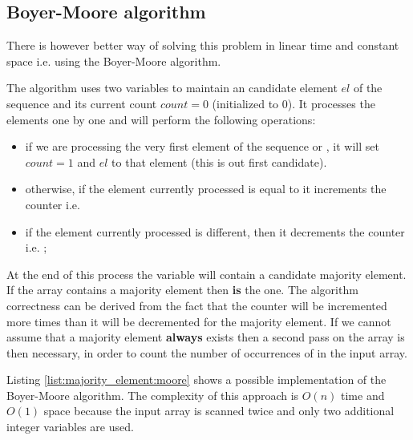 

\subsection{Boyer-Moore algorithm}
\label{majority_element:sec:linear}
There is however better way of solving this problem in linear time and constant space i.e. using the Boyer-Moore algorithm\cite{Boyer1991}.

The algorithm uses two variables to maintain an candidate element $el$ of the sequence and its current count $count=0$ (initialized to $0$). It processes the elements one by one and will perform the following operations:
\begin{itemize}
	\item if we are processing the very first element  of the sequence or , it will set $count=1$ and $el$ to that element (this is out first candidate).
	\item otherwise, if the element currently processed is equal to it increments the counter i.e. 
	\item if the element currently processed is different, then it decrements the counter i.e. ;
\end{itemize}


At the end of this process the variable  will contain a candidate majority element. If the array contains a majority element then  \textbf{is} the one. The algorithm correctness can be derived from the fact that the counter will be incremented more times than it will be decremented for the majority element. If we cannot assume that a majority element \textbf{always} exists then a second pass  on the array is then necessary, in order to count the number of occurrences of  in the input array.

Listing \ref{list:majority_element:moore} shows a possible implementation of the Boyer-Moore algorithm. The complexity of this approach is $O(n)$ time and $O(1)$ space because the input array is scanned twice and only two additional integer variables are used.




